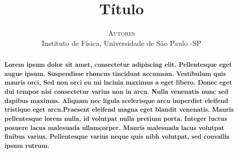 \documentclass[twoside]{article}
\title{\vspace{-18mm}\fontsize{18pt}{20pt}\selectfont\textbf{Título}}
\author{
\large
\textsc{Autores}\\[2mm]
\large Instituto de Física, Universidade de São Paulo -SP 
}
\date{}
\begin{document}
\maketitle

\thispagestyle{fancy} 
 

\begin{abstract}
\textbf{Lorem ipsum dolor sit amet, consectetur adipiscing elit. Pellentesque eget augue ipsum. Suspendisse rhoncus tincidunt accumsan. Vestibulum quis mauris orci. Sed non orci eu mi lacinia maximus a eget libero. Donec eget dui tempor nisi consectetur varius non in arcu. Nulla venenatis nunc sed dapibus maximus. Aliquam nec ligula scelerisque arcu imperdiet eleifend tristique eget arcu.Praesent eleifend magna eget blandit venenatis. Mauris pellentesque lorem nulla, id volutpat nulla pretium porta. Integer luctus posuere lacus malesuada ullamcorper. Mauris malesuada lacus volutpat finibus varius. Pellentesque varius neque quis nibh volutpat, sed convallis ipsum rutrum.}
\end{abstract}
%
\vspace{0.5cm}
\end{document}
